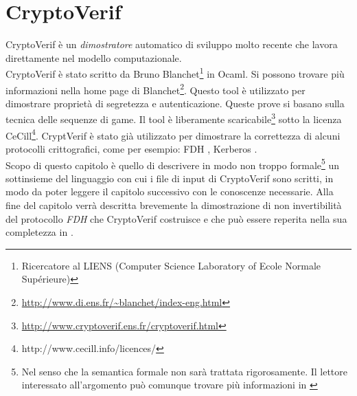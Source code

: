 \documentclass[a4paper,openright,twoside,12pt]{report}
\begin{document}
\chapter{CryptoVerif}
CryptoVerif \`e un \emph{dimostratore} automatico di sviluppo molto recente che lavora direttamente nel modello computazionale.\\
CryptoVerif \`e stato scritto da Bruno Blanchet\footnote{Ricercatore al LIENS (Computer Science Laboratory of Ecole Normale Supérieure)} in Ocaml. 
Si possono trovare pi\`u informazioni nella home page di Blanchet\footnote{\url{http://www.di.ens.fr/~blanchet/index-eng.html}}.
Questo tool \`e utilizzato per dimostrare propriet\`a di segretezza e autenticazione. Queste prove si basano sulla tecnica delle sequenze di game.
Il tool \`e liberamente scaricabile\footnote{\url{http://www.cryptoverif.ens.fr/cryptoverif.html}} sotto la licenza CeCill\footnote{http://www.cecill.info/licences/}.
CryptVerif \`e stato gi\`a utilizzato per dimostrare la correttezza di alcuni protocolli crittografici, come per esempio: FDH \cite{BlanchetPointchevalCrypto06}, 
Kerberos \cite{BlanchetJaggardScedrovTsayAsiaCCS08}.\\
Scopo di questo capitolo \`e quello di descrivere in modo non troppo formale\footnote{Nel senso che la semantica formale non sar\`a trattata rigorosamente. 
Il lettore interessato all'argomento pu\`o comunque trovare pi\`u informazioni in \cite{BlanchetJaggardScedrovTsayAsiaCCS08}} 
un sottinsieme del linguaggio con cui i file di input di CryptoVerif sono scritti, in modo 
da poter leggere il capitolo successivo con le conoscenze necessarie.
Alla fine del capitolo verr\`a descritta brevemente la dimostrazione di non invertibilit\`a del protocollo \emph{FDH} che CryptoVerif costruisce e che pu\`o essere reperita
nella sua completezza in  \cite{BlanchetPointchevalCrypto06}.
\newpage
\end{document}
